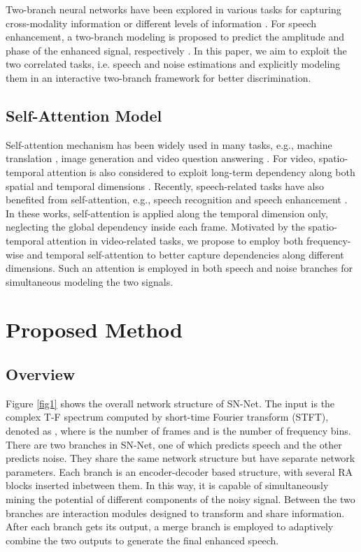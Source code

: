 \documentclass[letterpaper]{article} \usepackage{snnet}  \usepackage{times}  \usepackage{helvet} \usepackage{courier}  \usepackage[hyphens]{url}  \usepackage{graphicx} \urlstyle{rm} \def\UrlFont{\rm}  \usepackage{graphicx}  \usepackage{natbib}  \usepackage{caption} \usepackage{amsfonts}  \usepackage{amsmath}  \usepackage{multirow} \usepackage{tablefootnote}  \usepackage[switch]{lineno}
\begin{document}
\noindent Two-branch neural networks have been explored in various tasks for capturing cross-modality information \cite{nam2017dual, image-text} or different levels of information \cite{simonyan2014two, wang2020dual}. For speech enhancement, a two-branch modeling is proposed to predict the amplitude and phase of the enhanced signal, respectively \cite{yin2020phasen}. In this paper, we aim to exploit the two correlated tasks, i.e. speech and noise estimations and explicitly modeling them in an interactive two-branch framework for better discrimination.

\subsection{Self-Attention Model}

\noindent Self-attention mechanism has been widely used in many tasks, e.g., machine translation \cite{vaswani2017attention}, image generation \cite{zhang2019self} and video question answering \cite{li2019beyond}. For video, spatio-temporal attention is also considered to exploit long-term dependency along both spatial and temporal dimensions \cite{wu2019video}. Recently, speech-related tasks have also benefited from self-attention, e.g., speech recognition \cite{salazar2019ctc} and speech enhancement \cite{kim2020tgsa, koizumi2020speech}. In these works, self-attention is applied along the temporal dimension only, neglecting the global dependency inside each frame. Motivated by the spatio-temporal attention in video-related tasks, we propose to employ both frequency-wise and temporal self-attention to better capture dependencies along different dimensions. Such an attention is employed in both speech and noise branches for simultaneous modeling the two signals.

\section{Proposed Method}

\subsection{Overview}

\noindent Figure \ref{fig1} shows the overall network structure of SN-Net. The input is the complex T-F spectrum computed by short-time Fourier transform (STFT), denoted as , where  is the number of frames and  is the number of frequency bins. There are two branches in SN-Net, one of which predicts speech and the other predicts noise. They share the same network structure but have separate network parameters. Each branch is an encoder-decoder based structure, with several RA blocks inserted inbetween them. In this way, it is capable of simultaneously mining the potential of different components of the noisy signal. Between the two branches are interaction modules designed to transform and share information. After each branch gets its output, a merge branch is employed to adaptively combine the two outputs to generate the final enhanced speech.
\end{document}
